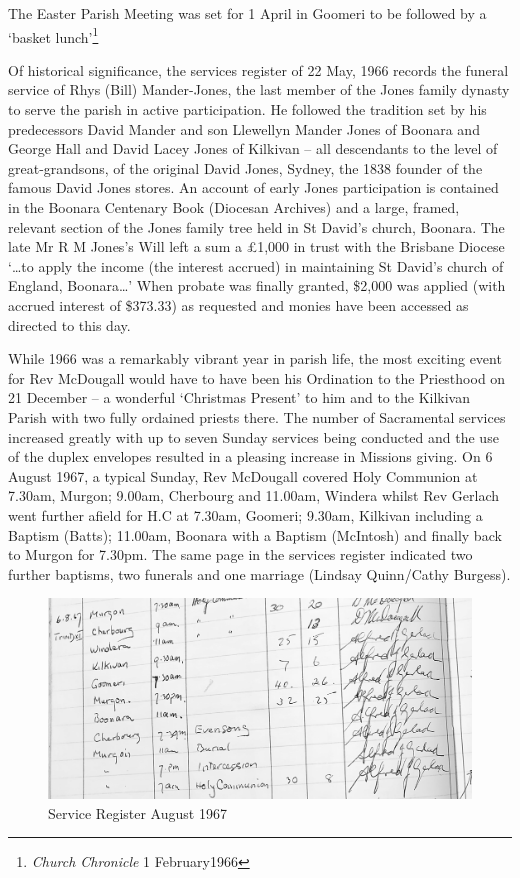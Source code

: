The Easter Parish Meeting was set for 1 April in Goomeri to be followed
by a `basket lunch'\footnote{\emph{Church Chronicle} 1 February1966}

Of historical significance, the services register of 22 May, 1966
records the funeral service of Rhys (Bill) Mander-Jones, the last member
of the Jones family dynasty to serve the parish in active participation.
He followed the tradition set by his predecessors David Mander and son
Llewellyn Mander Jones of Boonara and George Hall and David Lacey Jones
of Kilkivan -- all descendants to the level of great-grandsons, of the
original David Jones, Sydney, the 1838 founder of the famous David Jones
stores. An account of early Jones participation is contained in the
Boonara Centenary Book (Diocesan Archives) and a large, framed, relevant
section of the Jones family tree held in St David's church, Boonara. The
late Mr R M Jones's Will left a sum a \pounds1,000 in trust with the Brisbane
Diocese `\ldots to apply the income (the interest accrued) in
maintaining St David's church of England, Boonara\ldots' When probate
was finally granted, \$2,000 was applied (with accrued interest of
\$373.33) as requested and monies have been accessed as directed to this
day.

While 1966 was a remarkably vibrant year in parish life, the most
exciting event for Rev McDougall would have to have been his Ordination
to the Priesthood on 21 December -- a wonderful `Christmas Present' to
him and to the Kilkivan Parish with two fully ordained priests there.
The number of Sacramental services increased greatly with up to seven
Sunday services being conducted and the use of the duplex envelopes
resulted in a pleasing increase in Missions giving. On 6 August 1967, a
typical Sunday, Rev McDougall covered Holy Communion at 7.30am, Murgon;
9.00am, Cherbourg and 11.00am, Windera whilst Rev Gerlach went further
afield for H.C at 7.30am, Goomeri; 9.30am, Kilkivan including a Baptism
(Batts); 11.00am, Boonara with a Baptism (McIntosh) and finally back to
Murgon for 7.30pm. The same page in the services register indicated two
further baptisms, two funerals and one marriage (Lindsay Quinn/Cathy
Burgess).




\begin{figure}[!h]
\begin{center}
\includegraphics[width=1.\textwidth,center]{images/serviceRegisterAug1967.jpg}
\caption{Service Register August 1967}
\end{center}
\end{figure}


